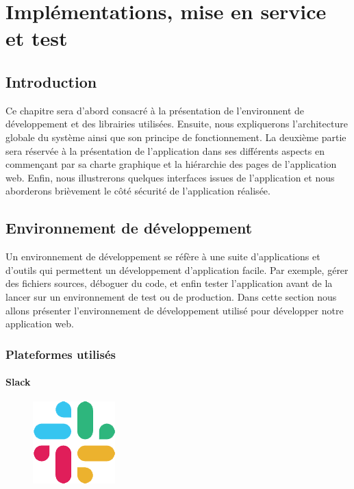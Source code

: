 \chapter{Implémentations, mise en service et test}
\renewcommand{\headrulewidth}{1pt}

\section{Introduction}
Ce chapitre sera d'abord consacré à la présentation de l’environnent de
développement et des librairies utilisées. Ensuite, nous expliquerons
l’architecture globale du système ainsi que son principe de fonctionnement. La
deuxième partie sera réservée à la présentation de l’application dans ses
différents aspects en commençant par sa charte graphique et la hiérarchie des
pages de l’application web. Enfin, nous illustrerons quelques interfaces issues
de l’application et nous aborderons brièvement le côté sécurité de l’application
réalisée.   

\section{Environnement de développement}
Un environnement de développement se réfère à une suite d’applications et 
d’outils qui permettent un développement d’application facile. Par exemple, 
gérer des fichiers sources, déboguer du code, et enfin tester l’application 
avant de la lancer sur un environnement de test ou de production. Dans cette 
section nous allons présenter l’environnement de développement utilisé pour 
développer notre application web.

\subsection{Plateformes utilisés}

\subsubsection*{Slack}
\begin{figure}
    \vspace{-22pt}
    \begin{center}
        \includegraphics[scale=0.36]{images/logo/slack.png}
        \label{fig62}
    \end{center}
    \vspace{-20pt}
    \vspace{-10pt}
\end{figure}

